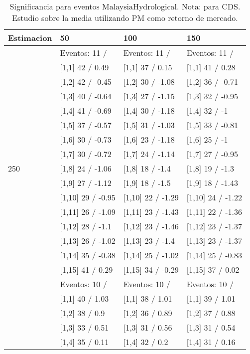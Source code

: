 \begin{table}

\caption{Significancia para eventos MalaysiaHydrological. Nota: para CDS. Estudio sobre la media utilizando PM como retorno de mercado.}
\centering
\begin{tabular}[t]{llll}
\toprule
Estimacion & 50 & 100 & 150\\
\midrule
 & Eventos:  11 / & Eventos:  11 / & Eventos:  11 /\\
 & {}[1,1] 42  / 0.49 & {}[1,1] 37  / 0.15 & {}[1,1] 41  / 0.28\\
 & {}[1,2] 42  / -0.45 & {}[1,2] 30  / -1.08 & {}[1,2] 36  / -0.71\\
 & {}[1,3] 40  / -0.64 & {}[1,3] 27  / -1.15 & {}[1,3] 32  / -0.95\\
 & {}[1,4] 41  / -0.69 & {}[1,4] 30  / -1.18 & {}[1,4] 32  / -1\\
\addlinespace
 & {}[1,5] 37  / -0.57 & {}[1,5] 31  / -1.03 & {}[1,5] 33  / -0.81\\
 & {}[1,6] 30  / -0.73 & {}[1,6] 23  / -1.18 & {}[1,6] 25  / -1\\
 & {}[1,7] 30  / -0.72 & {}[1,7] 24  / -1.14 & {}[1,7] 27  / -0.95\\
250 & {}[1,8] 24  / -1.06 & {}[1,8] 18  / -1.4 & {}[1,8] 19  / -1.3\\
 & {}[1,9] 27  / -1.12 & {}[1,9] 18  / -1.5 & {}[1,9] 18  / -1.43\\
\addlinespace
 & {}[1,10] 29  / -0.95 & {}[1,10] 22  / -1.29 & {}[1,10] 24  / -1.22\\
 & {}[1,11] 26  / -1.09 & {}[1,11] 23  / -1.43 & {}[1,11] 22  / -1.36\\
 & {}[1,12] 28  / -1.1 & {}[1,12] 23  / -1.46 & {}[1,12] 23  / -1.37\\
 & {}[1,13] 26  / -1.02 & {}[1,13] 23  / -1.4 & {}[1,13] 23  / -1.37\\
 & {}[1,14] 35  / -0.38 & {}[1,14] 25  / -1.02 & {}[1,14] 25  / -0.83\\
\addlinespace
 & {}[1,15] 41  / 0.29 & {}[1,15] 34  / -0.29 & {}[1,15] 37  / 0.02\\
 & Eventos:  10 / & Eventos:  10 / & Eventos:  10 /\\
 & {}[1,1] 40  / 1.03 & {}[1,1] 38  / 1.01 & {}[1,1] 39  / 1.01\\
 & {}[1,2] 38  / 0.9 & {}[1,2] 36  / 0.89 & {}[1,2] 37  / 0.88\\
 & {}[1,3] 33  / 0.51 & {}[1,3] 31  / 0.56 & {}[1,3] 31  / 0.54\\
\addlinespace
 & {}[1,4] 35  / 0.11 & {}[1,4] 32  / 0.2 & {}[1,4] 31  / 0.16\\

\end{tabular}
\end{table}
